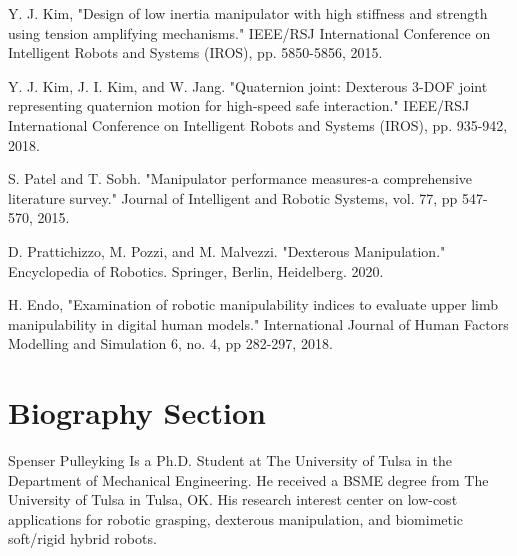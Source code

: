 \documentclass[journal]{IEEEtran}
\begin{document}
\begin{thebibliography}{1}
  Y. J. Kim, "Design of low inertia manipulator with high stiffness and strength using tension amplifying mechanisms." IEEE/RSJ International Conference on Intelligent Robots and Systems (IROS), pp. 5850-5856, 2015.

 Y. J. Kim, J. I. Kim, and W. Jang. "Quaternion joint: Dexterous 3-DOF joint representing quaternion motion for high-speed safe interaction." IEEE/RSJ International Conference on Intelligent Robots and Systems (IROS), pp. 935-942, 2018.

 S. Patel and T. Sobh. "Manipulator performance measures-a comprehensive literature survey." Journal of Intelligent and Robotic Systems, vol. 77, pp 547-570, 2015.

 D. Prattichizzo, M. Pozzi, and M. Malvezzi. "Dexterous Manipulation." Encyclopedia of Robotics. Springer, Berlin, Heidelberg. 2020.

 H. Endo, "Examination of robotic manipulability indices to evaluate upper limb manipulability in digital human models." International Journal of Human Factors Modelling and Simulation 6, no. 4, pp 282-297, 2018.

\end{thebibliography}

\newpage 

\section{Biography Section}

\vspace{11pt}

\begin{IEEEbiography}{Spenser Pulleyking}
Is a Ph.D. Student at The University of Tulsa in the Department of Mechanical Engineering. He received a BSME degree from The University of Tulsa in Tulsa, OK. His research interest center on low-cost applications for robotic grasping, dexterous manipulation, and biomimetic soft/rigid hybrid robots.  
\end{IEEEbiography}
\end{document}
